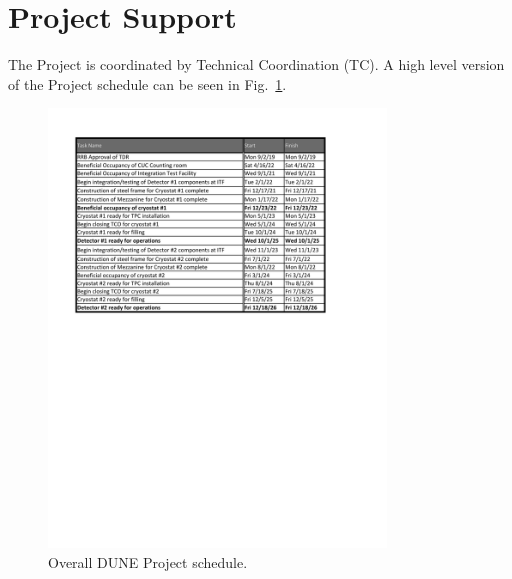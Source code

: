 \section{Project Support}
\label{sec:fdsp-coord-supp}

The  Project is coordinated by Technical Coordination
(TC). 
A high level version of the 
Project schedule can be seen in Fig.~\ref{fig:DUNE_schedule}.
\begin{figure}[htb]
  \begin{center}
    \includegraphics[width=0.8\textwidth]{far-detector-generic/figures/FD_Cnst_Schedule}
    \caption{Overall DUNE Project schedule.}
    \label{fig:DUNE_schedule}
  \end{center}
\end{figure}



